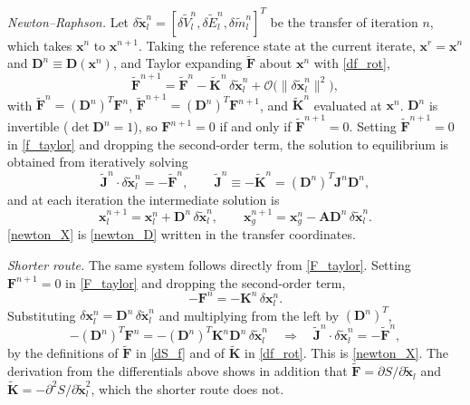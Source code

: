 \emph{Newton--Raphson.} Let $\delta\tilde{\boldsymbol{x}}_l^n=[\delta\tilde{V}_l^n,\delta\tilde{E}_l^n,\delta\tilde{m}_l^n]^T$ be the transfer of iteration $n$, which takes $\boldsymbol{x}^n$ to $\boldsymbol{x}^{n+1}$. Taking the reference state at the current iterate, $\boldsymbol{x}^r=\boldsymbol{x}^n$ and $\boldsymbol{D}^n\equiv\boldsymbol{D}(\boldsymbol{x}^n)$, and Taylor expanding $\tilde{\boldsymbol{F}}$ about $\boldsymbol{x}^n$ with \eqref{df_rot},
\begin{equation}\label{f_taylor}
\tilde{\boldsymbol{F}}^{n+1}=\tilde{\boldsymbol{F}}^n-\tilde{\boldsymbol{K}}^n\,\delta\tilde{\boldsymbol{x}}_l^n+\mathcal{O}\bigl(\lVert\delta\tilde{\boldsymbol{x}}_l^n\rVert^2\bigr),
\end{equation}
with $\tilde{\boldsymbol{F}}^{n}=(\boldsymbol{D}^n)^T\boldsymbol{F}^{n}$, $\tilde{\boldsymbol{F}}^{n+1}=(\boldsymbol{D}^n)^T\boldsymbol{F}^{n+1}$, and $\tilde{\boldsymbol{K}}^n$ evaluated at $\boldsymbol{x}^n$. $\boldsymbol{D}^n$ is invertible ($\det\boldsymbol{D}^n=1$), so $\boldsymbol{F}^{n+1}=0$ if and only if $\tilde{\boldsymbol{F}}^{n+1}=0$. Setting $\tilde{\boldsymbol{F}}^{n+1}=0$ in \eqref{f_taylor} and dropping the second-order term, the solution to equilibrium is obtained from iteratively solving
\begin{equation}\label{newton_X}
\tilde{\boldsymbol{J}}^n\cdot\delta\tilde{\boldsymbol{x}}_l^n=-\tilde{\boldsymbol{F}}^n,\qquad \tilde{\boldsymbol{J}}^n\equiv-\tilde{\boldsymbol{K}}^n=(\boldsymbol{D}^n)^T\boldsymbol{J}^n\boldsymbol{D}^n,
\end{equation}
and at each iteration the intermediate solution is
\begin{equation}\label{update_X}
\boldsymbol{x}_l^{n+1}=\boldsymbol{x}_l^n+\boldsymbol{D}^n\,\delta\tilde{\boldsymbol{x}}_l^n,\qquad \boldsymbol{x}_g^{n+1}=\boldsymbol{x}_g^n-\boldsymbol{A}\boldsymbol{D}^n\,\delta\tilde{\boldsymbol{x}}_l^n .
\end{equation}
\eqref{newton_X} is \eqref{newton_D} written in the transfer coordinates.

\emph{Shorter route.} The same system follows directly from \eqref{F_taylor}. Setting $\boldsymbol{F}^{n+1}=0$ in \eqref{F_taylor} and dropping the second-order term,
\begin{equation}
-\boldsymbol{F}^n=-\boldsymbol{K}^n\,\delta\boldsymbol{x}_l^n .
\end{equation}
Substituting $\delta\boldsymbol{x}_l^n=\boldsymbol{D}^n\,\delta\tilde{\boldsymbol{x}}_l^n$ and multiplying from the left by $(\boldsymbol{D}^n)^T$,
\begin{equation}
-(\boldsymbol{D}^n)^T\boldsymbol{F}^n=-(\boldsymbol{D}^n)^T\boldsymbol{K}^n\boldsymbol{D}^n\,\delta\tilde{\boldsymbol{x}}_l^n
\quad\Longrightarrow\quad
\tilde{\boldsymbol{J}}^n\cdot\delta\tilde{\boldsymbol{x}}_l^n=-\tilde{\boldsymbol{F}}^n,
\end{equation}
by the definitions of $\tilde{\boldsymbol{F}}$ in \eqref{dS_f} and of $\tilde{\boldsymbol{K}}$ in \eqref{df_rot}. This is \eqref{newton_X}. The derivation from the differentials above shows in addition that $\tilde{\boldsymbol{F}}=\partial S/\partial\tilde{\boldsymbol{x}}_l$ and $\tilde{\boldsymbol{K}}=-\partial^2S/\partial\tilde{\boldsymbol{x}}_l^2$, which the shorter route does not.


